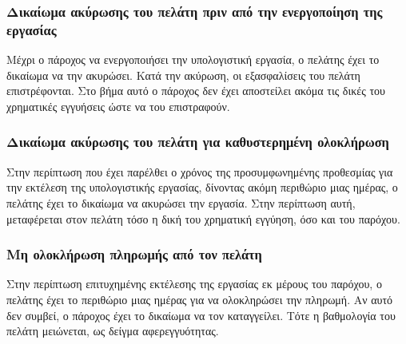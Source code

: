 \subsubsection{Δικαίωμα ακύρωσης του πελάτη πριν από την ενεργοποίηση της \\εργασίας}
Μέχρι ο πάροχος να ενεργοποιήσει την υπολογιστική εργασία, ο πελάτης έχει το δικαίωμα να την ακυρώσει. Κατά την ακύρωση, οι εξασφαλίσεις του πελάτη επιστρέφονται. Στο βήμα αυτό ο πάροχος δεν έχει αποστείλει ακόμα τις δικές του χρηματικές εγγυήσεις ώστε να του επιστραφούν.

\subsubsection{Δικαίωμα ακύρωσης του πελάτη για καθυστερημένη ολοκλήρωση}
Στην περίπτωση που έχει παρέλθει ο χρόνος της προσυμφωνημένης προθεσμίας για την εκτέλεση της υπολογιστικής εργασίας, δίνοντας ακόμη περιθώριο μιας ημέρας, ο πελάτης έχει το δικαίωμα να ακυρώσει την εργασία. Στην περίπτωση αυτή, μεταφέρεται στον πελάτη τόσο η δική του χρηματική εγγύηση, όσο και του παρόχου. 

\subsubsection{Μη ολοκλήρωση πληρωμής από τον πελάτη}
Στην περίπτωση επιτυχημένης εκτέλεσης της εργασίας εκ μέρους του παρόχου, ο πελάτης έχει το περιθώριο μιας ημέρας για να ολοκληρώσει την πληρωμή. Αν αυτό δεν συμβεί, ο πάροχος έχει το δικαίωμα να τον καταγγείλει. Τότε η βαθμολογία του πελάτη μειώνεται, ως δείγμα αφερεγγυότητας. \\

